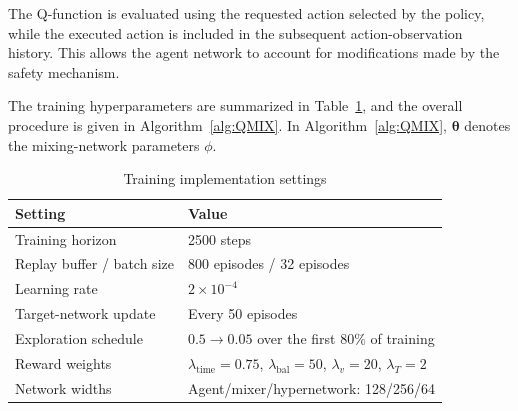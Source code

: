 The Q-function is evaluated using the requested action selected by the policy, while the executed action is included in the subsequent action-observation history. This allows the agent network to account for modifications made by the safety mechanism. 

The training hyperparameters are summarized in Table~\ref{tab:training_settings}, and the overall procedure is given in Algorithm~\ref{alg:QMIX}. In Algorithm~\ref{alg:QMIX}, $\bm{\theta}$ denotes the mixing-network parameters $\phi$.

\begin{table}[!t]
\centering
\caption{Training implementation settings}
\label{tab:training_settings}
\scriptsize
\setlength{\tabcolsep}{3pt}
\renewcommand{\arraystretch}{1.03}
\begin{tabular}{@{}p{}p{}@{}}
\toprule
\textbf{Setting} & \textbf{Value} \\
\midrule
Training horizon & 2500 steps \\
Replay buffer / batch size & 800 episodes / 32 episodes \\
Learning rate & $2\times10^{-4}$ \\
Target-network update & Every 50 episodes \\
Exploration schedule & $0.5\rightarrow0.05$ over the first 80\% of training \\
Reward weights & $\lambda_{\mathrm{time}}=0.75$, $\lambda_{\mathrm{bal}}=50$, $\lambda_v=20$, $\lambda_T=2$ \\
Network widths & Agent/mixer/hypernetwork: 128/256/64 \\
\bottomrule
\end{tabular}
\end{table}

